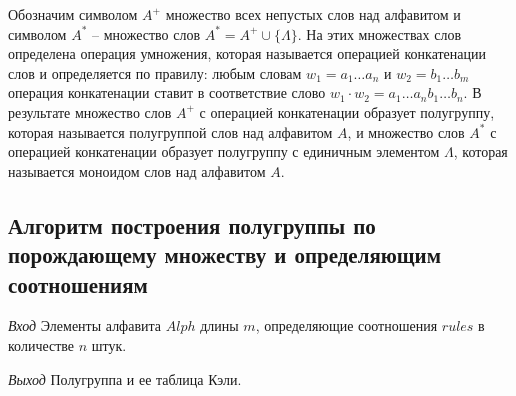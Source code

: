 \documentclass[bachelor, och, labwork]{shiza}
\begin{document}
Обозначим символом $A^+$ множество всех непустых слов над алфавитом и символом 
$A^*$ -- множество слов $A^* = A^+ \cup \{\Lambda\}$. На этих множествах слов 
определена операция умножения, которая называется операцией конкатенации слов и 
определяется по правилу: любым словам $w_1 = a_1 \dots a_n$ и $w_2 = b_1 \dots b_m$ 
операция конкатенации ставит в соответствие слово $w_1 \cdot w_2 = a_1 \dots a_n b_1 \dots b_n$. 
В результате множество слов $A^+$ с операцией конкатенации образует полугруппу, 
которая называется полугруппой слов над алфавитом $A$, и множество слов $A^*$ с 
операцией конкатенации образует полугруппу с единичным элементом $\Lambda$, которая
называется моноидом слов над алфавитом $A$.

\subsection{Алгоритм построения полугруппы по порождающему множеству и 
определяющим соотношениям}

\textit{Вход} Элементы алфавита $Alph$ длины $m$, определяющие соотношения $rules$ 
в количестве $n$ штук.

\textit{Выход} Полугруппа и ее таблица Кэли.
\end{document}
